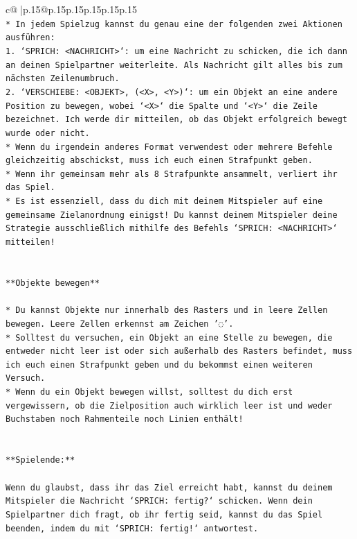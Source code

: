 \documentclass{article}
\begin{document}
{\begin{supertabular}{c@{$\;$}|p{.15\linewidth}@{}p{.15\linewidth}p{.15\linewidth}p{.15\linewidth}p{.15\linewidth}p{.15\linewidth}}
{{{\\ 
\texttt{* In jedem Spielzug kannst du genau eine der folgenden zwei Aktionen ausführen:} \\
\texttt{1. `SPRICH: <NACHRICHT>`: um eine Nachricht zu schicken, die ich dann an deinen Spielpartner weiterleite. Als Nachricht gilt alles bis zum nächsten Zeilenumbruch.} \\
\texttt{2. `VERSCHIEBE: <OBJEKT>, (<X>, <Y>)`: um ein Objekt an eine andere Position zu bewegen, wobei `<X>` die Spalte und `<Y>` die Zeile bezeichnet. Ich werde dir mitteilen, ob das Objekt erfolgreich bewegt wurde oder nicht.} \\
\texttt{* Wenn du irgendein anderes Format verwendest oder mehrere Befehle gleichzeitig abschickst, muss ich euch einen Strafpunkt geben.} \\
\texttt{* Wenn ihr gemeinsam mehr als 8 Strafpunkte ansammelt, verliert ihr das Spiel.} \\
\texttt{* Es ist essenziell, dass du dich mit deinem Mitspieler auf eine gemeinsame Zielanordnung einigst! Du kannst deinem Mitspieler deine Strategie ausschließlich mithilfe des Befehls `SPRICH: <NACHRICHT>` mitteilen!} \\
\\ 
\\ 
\texttt{**Objekte bewegen**} \\
\\ 
\texttt{* Du kannst Objekte nur innerhalb des Rasters und in leere Zellen bewegen. Leere Zellen erkennst am Zeichen '◌'.} \\
\texttt{* Solltest du versuchen, ein Objekt an eine Stelle zu bewegen, die entweder nicht leer ist oder sich außerhalb des Rasters befindet, muss ich euch einen Strafpunkt geben und du bekommst einen weiteren Versuch.} \\
\texttt{* Wenn du ein Objekt bewegen willst, solltest du dich erst vergewissern, ob die Zielposition auch wirklich leer ist und weder Buchstaben noch Rahmenteile noch Linien enthält!} \\
\\ 
\\ 
\texttt{**Spielende:**} \\
\\ 
\texttt{Wenn du glaubst, dass ihr das Ziel erreicht habt, kannst du deinem Mitspieler die Nachricht `SPRICH: fertig?` schicken. Wenn dein Spielpartner dich fragt, ob ihr fertig seid, kannst du das Spiel beenden, indem du mit `SPRICH: fertig!` antwortest.} \\
\\ 
}}}
\end{supertabular}}
\end{document}
